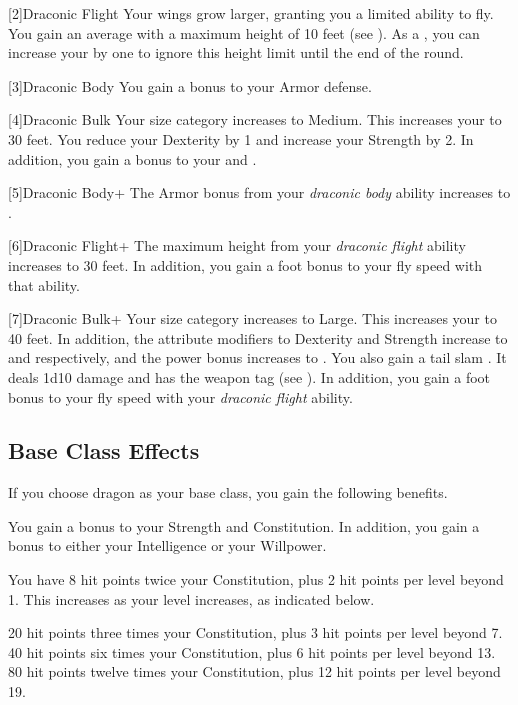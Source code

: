     [2]{Draconic Flight} Your wings grow larger, granting you a limited ability to fly.
      You gain an average  with a maximum height of 10 feet (see ).
      As a , you can increase your  by one to ignore this height limit until the end of the round.

    [3]{Draconic Body} You gain a  bonus to your Armor defense.

    [4]{Draconic Bulk} Your size category increases to Medium.
      This increases your  to 30 feet.
      You reduce your Dexterity by 1 and increase your Strength by 2.
      In addition, you gain a  bonus to your  and .

    [5]{Draconic Body+} The Armor bonus from your \textit{draconic body} ability increases to .

    [6]{Draconic Flight+} The maximum height from your \textit{draconic flight} ability increases to 30 feet.
      In addition, you gain a  foot bonus to your fly speed with that ability.

    [7]{Draconic Bulk+} Your size category increases to Large.
      This increases your  to 40 feet.
      In addition, the attribute modifiers to Dexterity and Strength increase to  and  respectively, and the power bonus increases to .
      You also gain a tail slam .
      It deals 1d10 damage and has the  weapon tag (see ).
      In addition, you gain a  foot bonus to your fly speed with your \textit{draconic flight} ability.

  \subsection{Base Class Effects}
    If you choose dragon as your base class, you gain the following benefits.

     You gain a  bonus to your Strength and Constitution. In addition, you gain a  bonus to either your Intelligence or your Willpower.

      You have 8 hit points \add twice your Constitution, plus 2 hit points per level beyond 1.
      This increases as your level increases, as indicated below.
      \begin{itemize}
         20 hit points \add three times your Constitution, plus 3 hit points per level beyond 7.
         40 hit points \add six times your Constitution, plus 6 hit points per level beyond 13.
         80 hit points \add twelve times your Constitution, plus 12 hit points per level beyond 19.
      \end{itemize}

